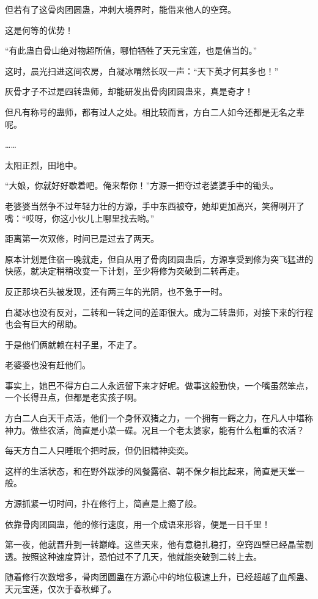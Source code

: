 \begin{this_body}
但若有了这骨肉团圆蛊，冲刺大境界时，能借来他人的空窍。

这是何等的优势！

“有此蛊白骨山绝对物超所值，哪怕牺牲了天元宝莲，也是值当的。”

这时，晨光扫进这间农房，白凝冰喟然长叹一声：“天下英才何其多也！”

灰骨才子不过是四转蛊师，却能研发出骨肉团圆蛊来，真是奇才！

但凡有称号的蛊师，都有过人之处。相比较而言，方白二人如今还都是无名之辈呢。

……

太阳正烈，田地中。

“大娘，你就好好歇着吧。俺来帮你！”方源一把夺过老婆婆手中的锄头。

老婆婆当然争不过年轻力壮的方源，手中东西被夺，她却更加高兴，笑得咧开了嘴：“哎呀，你这小伙儿上哪里找去哟。”

距离第一次双修，时间已是过去了两天。

原本计划是住宿一晚就走，但自从用了骨肉团圆蛊后，方源享受到修为突飞猛进的快感，就决定稍稍改变一下计划，至少将修为突破到二转再走。

反正那块石头被发现，还有两三年的光阴，也不急于一时。

白凝冰也没有反对，二转和一转之间的差距很大。成为二转蛊师，对接下来的行程也会有巨大的帮助。

于是他们俩就赖在村子里，不走了。

老婆婆也没有赶他们。

事实上，她巴不得方白二人永远留下来才好呢。做事这般勤快，一个嘴虽然笨点，一个长得丑点，但都是老实孩子啊。

方白二人白天干点活，他们一个身怀双猪之力，一个拥有一鳄之力，在凡人中堪称神力。做些农活，简直是小菜一碟。况且一个老太婆家，能有什么粗重的农活？

每天方白二人只睡眠个把时辰，但仍旧精神奕奕。

这样的生活状态，和在野外跋涉的风餐露宿、朝不保夕相比起来，简直是天堂一般。

方源抓紧一切时间，扑在修行上，简直是上瘾了般。

依靠骨肉团圆蛊，他的修行速度，用一个成语来形容，便是一日千里！

第一夜，他就晋升到一转巅峰。这些天来，他有意稳扎稳打，空窍四壁已经晶莹剔透。按照这种速度算计，恐怕过不了几天，他就能突破到二转上去。

随着修行次数增多，骨肉团圆蛊在方源心中的地位极速上升，已经超越了血颅蛊、天元宝莲，仅次于春秋蝉了。


\end{this_body}
